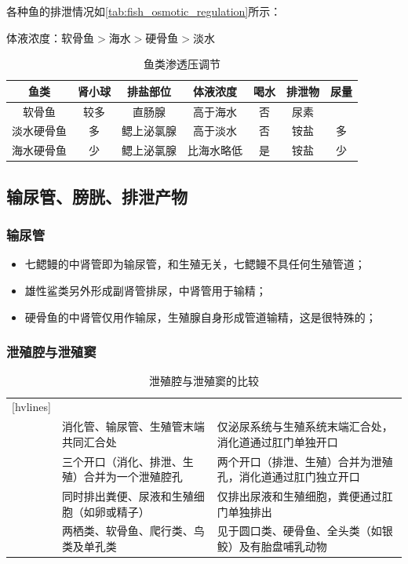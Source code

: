 各种鱼的排泄情况如\autoref{tab:fish_osmotic_regulation}所示：

体液浓度：软骨鱼$>$海水$>$硬骨鱼$>$淡水

\begin{table}[htbp]
	\centering
	\begin{tabularx}{\textwidth}{|C|c|C|C|c|c|c|}
		\hline
		鱼类 & 肾小球 & 排盐部位 & 体液浓度 & 喝水 & 排泄物 & 尿量 \\ \hline
		软骨鱼 & 较多 & 直肠腺 & 高于海水 & 否 & 尿素 &  \\ \hline
		淡水硬骨鱼 & 多 & 鳃上泌氯腺\footnotemark & 高于淡水 & 否 & 铵盐 & 多 \\ \hline
		海水硬骨鱼 & 少 & 鳃上泌氯腺 & 比海水略低 & 是 & 铵盐 & 少 \\ \hline
	\end{tabularx}
	\caption{鱼类渗透压调节}
	\label{tab:fish_osmotic_regulation}
\end{table}

\subsection{输尿管、膀胱、排泄产物}

\subsubsection{输尿管}

\begin{itemize}
	\item 七鳃鳗的中肾管即为输尿管，和生殖无关，七鳃鳗不具任何生殖管道；
	\item 雄性鲨类另外形成副肾管排尿，中肾管用于输精；
	\item 硬骨鱼的中肾管仅用作输尿，生殖腺自身形成管道输精，这是很特殊的；
\end{itemize}

\subsubsection{泄殖腔与泄殖窦}

\begin{table}[htbp]
	\centering
	\begin{NiceTabularX}{\textwidth}{cXX}[hvlines]
		&  &  \\
		 & 消化管、输尿管、生殖管末端共同汇合处 & 仅泌尿系统与生殖系统末端汇合处，消化道通过肛门单独开口 \\
		 & 三个开口（消化、排泄、生殖）合并为一个泄殖腔孔 & 两个开口（排泄、生殖）合并为泄殖孔，消化道通过肛门独立开口 \\
		 & 同时排出粪便、尿液和生殖细胞（如卵或精子）& 仅排出尿液和生殖细胞，粪便通过肛门单独排出 \\
		 & 两栖类、软骨鱼、爬行类、鸟类及单孔类 & 见于圆口类、硬骨鱼、全头类（如银鲛）及有胎盘哺乳动物
	\end{NiceTabularX}
	\caption{泄殖腔与泄殖窦的比较}
	\label{tab:ComparisonOfCloacaAndUrogenitalSinus}
\end{table}

